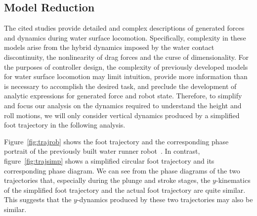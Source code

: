 \subsection{Model Reduction}
The cited studies provide detailed and complex descriptions of generated forces and dynamics during water surface locomotion. Specifically, complexity in these models arise from the hybrid dynamics imposed by the water contact discontinuity, the nonlinearity of drag forces and the curse of dimensionality. For the purposes of controller design, the complexity of previously developed models for water surface locomotion may limit intuition, provide more information than is necessary to accomplish the desired task, and preclude the development of analytic expressions for generated force and robot state. Therefore, to simplify and focus our analysis on the dynamics required to understand the height and roll motions, we will only consider vertical dynamics produced by a simplified foot trajectory in the following analysis. 

Figure~\ref{fig:trajrob} shows the foot trajectory  and the corresponding phase portrait of the previously built water runner robot~\cite{park2010roll}. In contrast, figure~\ref{fig:trajsimp} shows a simplified circular foot trajectory and its corresponding phase diagram. We can see from the phase diagrams of the two trajectories that, especially during the plunge and stroke stages, the $y$-kinematics of the simplified foot trajectory and the actual foot trajectory are quite similar. This suggests that the $y$-dynamics produced by these two trajectories may also be similar.

